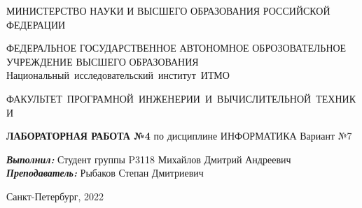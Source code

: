 

	\pagestyle{plain}
	\begin{center}
		\large МИНИСТЕРСТВО НАУКИ И ВЫСШЕГО ОБРАЗОВАНИЯ РОССИЙСКОЙ ФЕДЕРАЦИИ\
		\vspace*{5mm}
		
		\small ФЕДЕРАЛЬНОЕ ГОСУДАРСТВЕННОЕ АВТОНОМНОЕ ОБРОЗОВАТЕЛЬНОЕ УЧРЕЖДЕНИЕ ВЫСШЕГО ОБРАЗОВАНИЯ
		\mbox{\guillemotleft Национальный исследовательский институт ИТМО\guillemotright}
		\vspace*{10mm}
		
		\mbox{ФАКУЛЬТЕТ ПРОГРАМНОЙ ИНЖЕНЕРИИ И ВЫЧИСЛИТЕЛЬНОЙ ТЕХНИКИ}
		\vspace*{5mm}
		
		{\bf ЛАБОРАТОРНАЯ РАБОТА №4}
		\linebreak
		по дисциплине
		\linebreak
		\guillemotleft ИНФОРМАТИКА\guillemotright
		\linebreak
		\large Вариант №7
		\vspace*{50mm}
		
	\end{center}
	
	
	\begin{flushright}
		\textbf{\textit{Выполнил:}}
		\linebreak
		Студент группы P3118
		\linebreak
		Михайлов Дмитрий
		\linebreak
		Андреевич
		\linebreak
		\textbf{\textit{Преподаватель:}}
		\linebreak
		Рыбаков Степан
		\linebreak
		Дмитриевич
		\vspace*{30mm}
		
	\end{flushright}
	\begin{center}
		\small Санкт-Петербург, 2022
	\end{center}
	\thispagestyle{empty}
	\newpage
	
